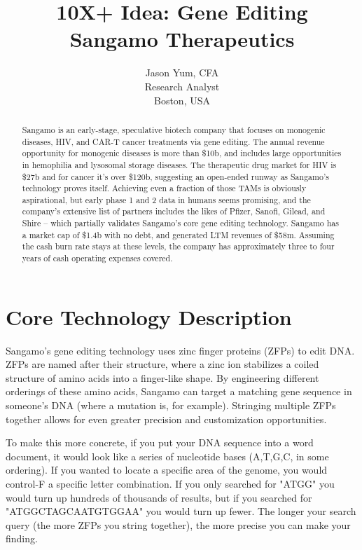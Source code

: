 \documentclass{article} %
\title{10X+ Idea: Gene Editing\\
 Sangamo Therapeutics}
\author{Jason Yum, CFA\\ %
Research Analyst  \\
Boston, USA \\
}
\begin{document}
\maketitle

\begin{abstract} 
Sangamo is an early-stage, speculative biotech company that focuses on monogenic diseases, HIV, and CAR-T cancer treatments via gene editing. The annual revenue opportunity for monogenic diseases is more than \$10b, and includes large opportunities in hemophilia and lysosomal storage diseases. The therapeutic drug market for HIV is \$27b and for cancer it's over \$120b, suggesting an open-ended runway as Sangamo's technology proves itself. Achieving even a fraction of those TAMs is obviously aspirational, but early phase 1 and 2 data in humans seems promising, and the company's extensive list of partners includes the likes of Pfizer, Sanofi, Gilead, and Shire -- which partially validates Sangamo's core gene editing technology. Sangamo has a market cap of \$1.4b with no debt, and generated LTM revenues of \$58m. Assuming the cash burn rate stays at these levels, the company has approximately three to four years of cash operating expenses covered. 
\end{abstract} 

\section{Core Technology Description}   
Sangamo's gene editing technology uses zinc finger proteins (ZFPs) to edit DNA. ZFPs are named after their structure, where a zinc ion stabilizes a coiled structure of amino acids into a finger-like shape. By engineering different orderings of these amino acids, Sangamo can target a matching gene sequence in someone's DNA (where a mutation is, for example). Stringing multiple ZFPs together allows for even greater precision and customization opportunities. 

To make this more concrete, if you put your DNA sequence into a word document, it would look like a series of nucleotide bases (A,T,G,C, in some ordering). If you wanted to locate a specific area of the genome, you would control-F a specific letter combination. If you only searched for "ATGG" you would turn up hundreds of thousands of results, but if you searched for "ATGGCTAGCAATGTGGAA" you would turn up fewer. The longer your search query (the more ZFPs you string together), the more precise you can make your finding.
\end{document}
